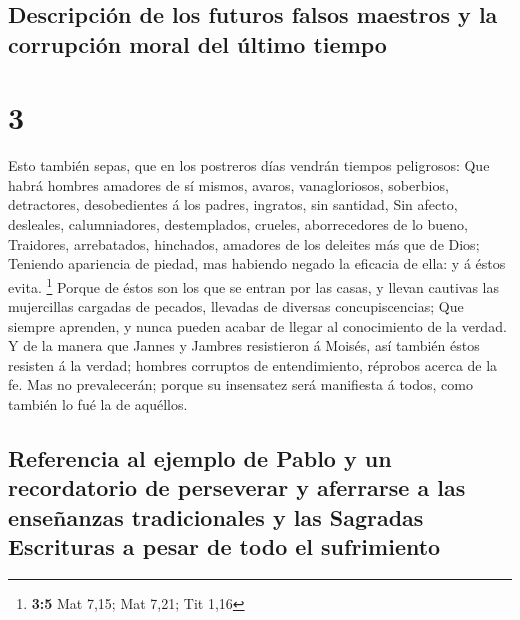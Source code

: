 \hypertarget{descripciuxf3n-de-los-futuros-falsos-maestros-y-la-corrupciuxf3n-moral-del-uxfaltimo-tiempo}{%
\subsection{Descripción de los futuros falsos maestros y la corrupción
moral del último
tiempo}\label{descripciuxf3n-de-los-futuros-falsos-maestros-y-la-corrupciuxf3n-moral-del-uxfaltimo-tiempo}}

\hypertarget{section-2}{%
\section{3}\label{section-2}}

 Esto también sepas, que en los postreros días vendrán
tiempos peligrosos:  Que habrá hombres amadores de sí
mismos, avaros, vanagloriosos, soberbios, detractores, desobedientes á
los padres, ingratos, sin santidad,  Sin afecto, desleales,
calumniadores, destemplados, crueles, aborrecedores de lo bueno,
 Traidores, arrebatados, hinchados, amadores de los deleites
más que de Dios;  Teniendo apariencia de piedad, mas
habiendo negado la eficacia de ella: y á éstos evita. \footnote{\textbf{3:5}
  Mat 7,15; Mat 7,21; Tit 1,16}  Porque de éstos son los que
se entran por las casas, y llevan cautivas las mujercillas cargadas de
pecados, llevadas de diversas concupiscencias;  Que siempre
aprenden, y nunca pueden acabar de llegar al conocimiento de la verdad.
 Y de la manera que Jannes y Jambres resistieron á Moisés,
así también éstos resisten á la verdad; hombres corruptos de
entendimiento, réprobos acerca de la fe.  Mas no
prevalecerán; porque su insensatez será manifiesta á todos, como también
lo fué la de aquéllos.

\hypertarget{referencia-al-ejemplo-de-pablo-y-un-recordatorio-de-perseverar-y-aferrarse-a-las-enseuxf1anzas-tradicionales-y-las-sagradas-escrituras-a-pesar-de-todo-el-sufrimiento}{%
\subsection{Referencia al ejemplo de Pablo y un recordatorio de
perseverar y aferrarse a las enseñanzas tradicionales y las Sagradas
Escrituras a pesar de todo el
sufrimiento}\label{referencia-al-ejemplo-de-pablo-y-un-recordatorio-de-perseverar-y-aferrarse-a-las-enseuxf1anzas-tradicionales-y-las-sagradas-escrituras-a-pesar-de-todo-el-sufrimiento}}

